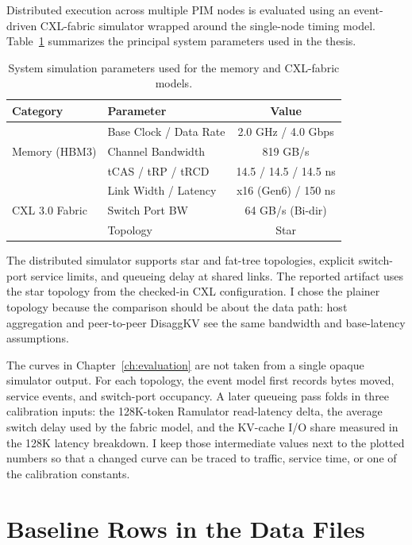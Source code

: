 Distributed execution across multiple PIM nodes is evaluated using an event-driven CXL-fabric simulator wrapped around the single-node timing model. Table~\ref{tab:sim_params} summarizes the principal system parameters used in the thesis.

\begin{table}[htbp]
\centering
\caption[Simulation parameters]{System simulation parameters used for the memory and CXL-fabric models.}
\label{tab:sim_params}
\begin{tabular}{llc}
\toprule
\textbf{Category} & \textbf{Parameter} & \textbf{Value} \\
\midrule
\multirow{3}{*}{Memory (HBM3)} & Base Clock / Data Rate & 2.0 GHz / 4.0 Gbps \\
                              & Channel Bandwidth      & 819 GB/s \\
                              & tCAS / tRP / tRCD     & 14.5 / 14.5 / 14.5 ns \\
\midrule
\multirow{3}{*}{CXL 3.0 Fabric} & Link Width / Latency  & x16 (Gen6) / 150 ns \\
                              & Switch Port BW        & 64 GB/s (Bi-dir) \\
                              & Topology              & Star \\
\bottomrule
\end{tabular}
\end{table}

The distributed simulator supports star and fat-tree topologies, explicit switch-port service limits, and queueing delay at shared links. The reported artifact uses the star topology from the checked-in CXL configuration. I chose the plainer topology because the comparison should be about the data path: host aggregation and peer-to-peer DisaggKV see the same bandwidth and base-latency assumptions.

The curves in Chapter~\ref{ch:evaluation} are not taken from a single opaque simulator output. For each topology, the event model first records bytes moved, service events, and switch-port occupancy. A later queueing pass folds in three calibration inputs: the 128K-token Ramulator read-latency delta, the average switch delay used by the fabric model, and the KV-cache I/O share measured in the 128K latency breakdown. I keep those intermediate values next to the plotted numbers so that a changed curve can be traced to traffic, service time, or one of the calibration constants.

\section{Baseline Rows in the Data Files}

